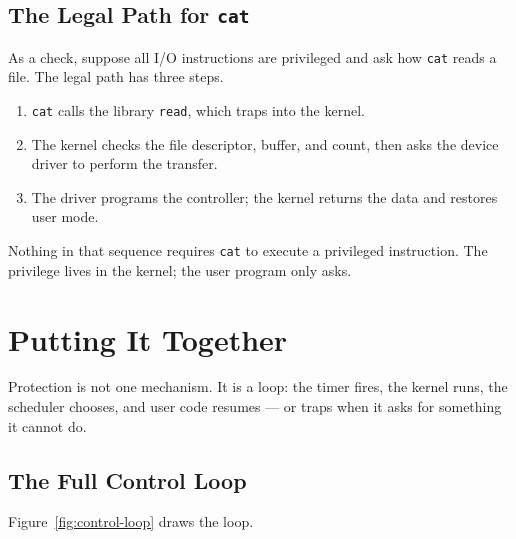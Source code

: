 \documentclass[11pt]{article}
\begin{document}
\subsection{The Legal Path for \texttt{cat}}

As a check, suppose all I/O instructions are privileged and ask how
\texttt{cat} reads a file. The legal path has three steps.
\begin{enumerate}
  \item \texttt{cat} calls the library \texttt{read}, which traps into the
    kernel.
  \item The kernel checks the file descriptor, buffer, and count, then asks the
    device driver to perform the transfer.
  \item The driver programs the controller; the kernel returns the data and
    restores user mode.
\end{enumerate}
Nothing in that sequence requires \texttt{cat} to execute a privileged
instruction. The privilege lives in the kernel; the user program only asks.

\section{Putting It Together}
\noindent{}

Protection is not one mechanism. It is a loop: the timer fires, the kernel
runs, the scheduler chooses, and user code resumes --- or traps when it asks
for something it cannot do.

\subsection{The Full Control Loop}

Figure~\ref{fig:control-loop} draws the loop.
\end{document}
